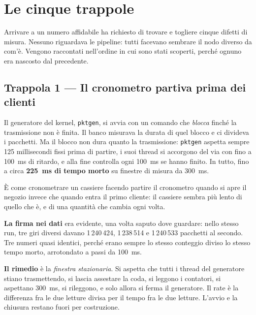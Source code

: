 \documentclass[11pt,a4paper,oneside]{report}
\begin{document}
\section{Le cinque trappole}

Arrivare a un numero affidabile ha richiesto di trovare e togliere cinque
difetti di misura. Nessuno riguardava le pipeline: tutti facevano sembrare il
nodo diverso da com'è. Vengono raccontati nell'ordine in cui sono stati
scoperti, perché ognuno era nascosto dal precedente.

\subsection*{Trappola 1 --- Il cronometro partiva prima dei clienti}

Il generatore del kernel, \texttt{pktgen}, si avvia con un comando che
\emph{blocca} finché la trasmissione non è finita. Il banco misurava la durata
di quel blocco e ci divideva i pacchetti. Ma il blocco non dura quanto la
trasmissione: \texttt{pktgen} aspetta sempre 125 millisecondi fissi prima di
partire, i suoi thread si accorgono del via con fino a 100~ms di ritardo, e alla
fine controlla ogni 100~ms se hanno finito. In tutto, fino a circa
\textbf{225~ms di tempo morto} su finestre di misura da 300~ms.

È come cronometrare un cassiere facendo partire il cronometro quando si apre il
negozio invece che quando entra il primo cliente: il cassiere sembra più lento
di quello che è, e di una quantità che cambia ogni volta.

\textbf{La firma nei dati} era evidente, una volta saputo dove guardare: nello
stesso run, tre giri diversi davano 1\,240\,424, 1\,238\,514 e 1\,240\,533
pacchetti al secondo. Tre numeri quasi identici, perché erano sempre lo stesso
conteggio diviso lo stesso tempo morto, arrotondato a passi da 100~ms.

\textbf{Il rimedio} è la \emph{finestra stazionaria}. Si aspetta che tutti i
thread del generatore stiano trasmettendo, si lascia assestare la coda, si
leggono i contatori, si aspettano 300~ms, si rileggono, e solo allora si ferma
il generatore. Il rate è la differenza fra le due letture divisa per il tempo
fra le due letture. L'avvio e la chiusura restano fuori per costruzione.
\end{document}
